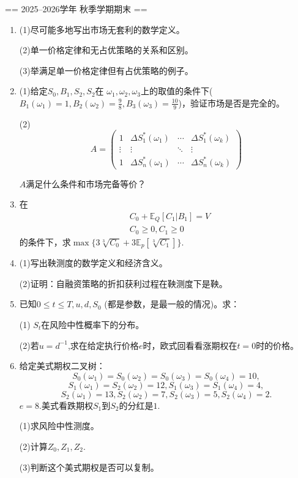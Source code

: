 
== 2025--2026学年 秋季学期期末 ==
\begin{enumerate}
    \item[一、](1)尽可能多地写出市场无套利的数学定义。

    (2)单一价格定律和无占优策略的关系和区别。

    (3)举满足单一价格定律但有占优策略的例子。

    \item[二、](1)给定$S_0,B_1,S_2,S_2$在
    $\omega_1,\omega_2,\omega_3$上的取值的条件下($B_1(\omega_1)=1,
    B_2(\omega_2)=\frac98,B_3(\omega_3)=\frac{10}9$)，验证市场是否是完全的。

    (2)
    \[A=\begin{pmatrix}1 & \Delta S_1^*(\omega_1) &\cdots &\Delta S_1^*(\omega_k)\\
    \vdots &\vdots &\ddots &\vdots\\
    1 & \Delta S_n^*(\omega_1)&\cdots &\Delta S_n^*(\omega_k)\end{pmatrix}\]

    $A$满足什么条件和市场完备等价？

    \item[三、]在
    \begin{align}
        &C_0+\mathbb{E}_Q[C_1|B_1]=V\\
        &C_0\ge 0,C_1\ge 0
    \end{align}
    的条件下，求\(\max \{3\sqrt[3]{C_0}+3\mathbb{E}_p[\sqrt[3]{C_1}]\}\).
    \item[四、](1)写出鞅测度的数学定义和经济含义。

    (2)证明：自融资策略的折扣获利过程在鞅测度下是鞅。

    \item[五、]已知$0\le t\le T,u,d,S_0$ (都是参数，是最一般的情况)。求：
    
    (1) $S_t$在风险中性概率下的分布。

    (2)若$u=d^{-1}$,求在给定执行价格$e$时，欧式回看看涨期权在$t=0$时的价格。

    \item[六、]给定美式期权二叉树：
    \[S_0(\omega_1)=S_0(\omega_2)=S_0(\omega_3)=S_0(\omega_4)=10,\]
    \[S_1(\omega_1)=S_2(\omega_2)=12,S_1(\omega_3)=S_1(\omega_4)=4,\]
    \[S_2(\omega_1)=13,S_2(\omega_2)=7,S_2(\omega_3)=5,S_2(\omega_4)=2.\]
    $e=8$.美式看跌期权$S_1$到$S_2$的分红是$1$.

    (1)求风险中性测度。

    (2)计算$Z_0,Z_1,Z_2$.

    (3)判断这个美式期权是否可以复制。


\end{enumerate}